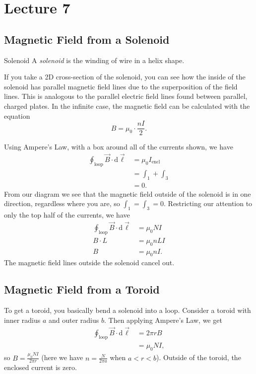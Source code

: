 \documentclass[class=article, crop=false]{standalone}
\begin{document}
  \section{Lecture 7}
  \subsection{Magnetic Field from a Solenoid}
  \begin{definition}{Solenoid}
    A \emph{solenoid} is the winding of wire in a helix shape.
  \end{definition}
  If you take a 2D cross-section of the solenoid, you can see how the inside of the solenoid has parallel magnetic field lines due to the superposition of the field lines. This is analogous to the parallel electric field lines found between parallel, charged plates. In the infinite case, the magnetic field can be calculated with the equation
  \[
    B = \mu_0\cdot \frac{nI}{2}.
  \]
  \begin{center}\end{center}
  Using Ampere's Law, with a box around all of the currents shown, we have
  \begin{align*}
    \oint_\text{loop} \vec{B}\cdot \mathrm{d}\vec{\ell} &= \mu_0I_\text{encl} \\
                                                        &= \int_1 + \int_3 \\
                                                        &= 0. \tag{The currents cancel}
  \end{align*}
  From our diagram we see that the magnetic field outside of the solenoid is in one direction, regardless where you are, so $\int_1 = \int_3 = 0$. Restricting our attention to only the top half of the currents, we have
  \begin{align*}
    \oint_\text{loop}\vec{B}\cdot \mathrm{d}\vec{\ell} &= \mu_0NI \\
    B\cdot L &= \mu_0nLI \\
    B &= \mu_0nI.
  \end{align*}
  The magnetic field lines outside the solenoid cancel out.
  \subsection{Magnetic Field from a Toroid}
  To get a toroid, you basically bend a solenoid into a loop. Consider a toroid with inner radius $a$ and outer radius $b$. Then applying Ampere's Law, we get
  \begin{align*}
    \oint_\text{loop}\vec{B}\cdot \mathrm{d}\vec{\ell} &= 2\pi rB \\
                                                       &= \mu_0NI,
  \end{align*}
  so $B = \frac{\mu_0NI}{2\pi r}$ (here we have $n = \frac{N}{2\pi a}$ when $a < r < b$). Outside of the toroid, the enclosed current is zero.
\end{document}

